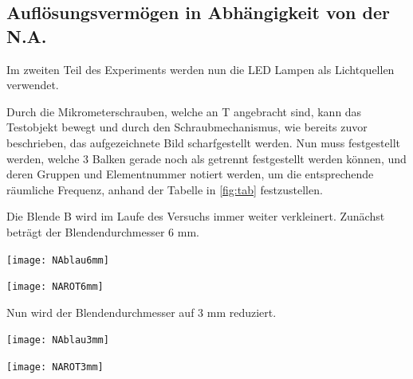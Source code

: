 \documentclass[11pt,ngerman]{scrartcl}
\begin{document}
\subsection{Auflösungsvermögen in Abhängigkeit von der N.A.}

\noindent Im zweiten Teil des Experiments werden nun die LED Lampen als Lichtquellen verwendet.

\vspace{2mm}

\noindent Durch die Mikrometerschrauben, welche an T angebracht sind, kann das Testobjekt bewegt und durch den Schraubmechanismus, wie bereits zuvor beschrieben, das aufgezeichnete Bild scharfgestellt werden. Nun muss festgestellt werden, welche 3 Balken gerade noch als getrennt festgestellt werden können, und deren Gruppen und Elementnummer notiert werden, um die entsprechende räumliche Frequenz, anhand der Tabelle in \autoref{fig:tab} festzustellen.

\vspace{2mm}

\noindent Die Blende B wird im Laufe des Versuchs immer weiter verkleinert. Zunächst beträgt der Blendendurchmesser 6 mm.

\vspace{2mm}

\begin{minipage}{\textwidth}
	\begin{minipage}[t]{0.5\textwidth}
		\centering
		\texttt{[image: NAblau6mm]}
		\label{fig:b_6}
	\end{minipage}
	\vspace{2mm}
	\begin{minipage}[t]{0.50\textwidth}
		\centering
		\texttt{[image: NAROT6mm]}
		\label{fig:r_6}
	\end{minipage}
	\vspace{1em}
\end{minipage}

\noindent Nun wird der Blendendurchmesser auf 3 mm reduziert.

\vspace{2mm}

\begin{minipage}{\textwidth}
	\begin{minipage}[t]{0.5\textwidth}
		\centering
		\texttt{[image: NAblau3mm]}
		\label{fig:b_3}
	\end{minipage}
	\vspace{2mm}
	\begin{minipage}[t]{0.50\textwidth}
		\centering
		\texttt{[image: NAROT3mm]}
		\label{fig:r_3}
	\end{minipage}
	\vspace{1em}
\end{minipage}
\end{document}
